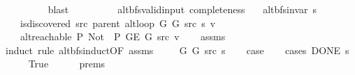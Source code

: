 \begin{isabellebody}
\ \ \ \ \ \ \ \ \isamarkupfalse%
\ blast\isanewline
\ \ \ \ \isamarkupfalse%
\isanewline
\ \ \isamarkupfalse%
\isanewline
{}\isamarkupfalse%
%
\endisatagproof
{\isafoldproof}%
%
\isadelimproof
\isanewline
%
\endisadelimproof
\isanewline
{}\isamarkupfalse%
\ {\isacharparenleft}{\kern0pt}\ alt{\isacharunderscore}{\kern0pt}bfs{\isacharunderscore}{\kern0pt}valid{\isacharunderscore}{\kern0pt}input{\isacharparenright}{\kern0pt}\ completeness{\isacharcolon}{\kern0pt}\isanewline
\ \ \ {\isachardoublequoteopen}alt{\isacharunderscore}{\kern0pt}bfs{\isacharunderscore}{\kern0pt}invar{\isacharprime}{\kern0pt}{\isacharprime}{\kern0pt}\ s{\isachardoublequoteclose}\isanewline
\ \ \ {\isachardoublequoteopen}{\isasymnot}\ is{\isacharunderscore}{\kern0pt}discovered\ src\ {\isacharparenleft}{\kern0pt}parent\ {\isacharparenleft}{\kern0pt}alt{\isacharunderscore}{\kern0pt}loop\ G{}\ G{}\ src\ s{\isacharparenright}{\kern0pt}{\isacharparenright}{\kern0pt}\ v{\isachardoublequoteclose}\isanewline
\ \ \ {\isachardoublequoteopen}{\isasymnot}\ alt{\isacharunderscore}{\kern0pt}reachable\ P{\isacharprime}{\kern0pt}{\isacharprime}{\kern0pt}\ {\isacharparenleft}{\kern0pt}Not\ {\isasymcirc}\ P{\isacharprime}{\kern0pt}{\isacharprime}{\kern0pt}{\isacharparenright}{\kern0pt}\ {\isacharparenleft}{\kern0pt}G{\isachardot}{\kern0pt}E\ G{\isacharparenright}{\kern0pt}\ src\ v{\isachardoublequoteclose}\isanewline
%
\isadelimproof
\ \ %
\endisadelimproof
%
\isatagproof
{}\isamarkupfalse%
\ assms\isanewline
{}\isamarkupfalse%
\ {\isacharparenleft}{\kern0pt}induct\ rule{\isacharcolon}{\kern0pt}\ alt{\isacharunderscore}{\kern0pt}bfs{\isacharunderscore}{\kern0pt}induct{\isacharbrackleft}{\kern0pt}OF\ assms{\isacharparenleft}{\kern0pt}{}{\isacharparenright}{\kern0pt}{\isacharbrackright}{\kern0pt}{\isacharparenright}{\kern0pt}\isanewline
\ \ \isamarkupfalse%
\ {\isacharparenleft}{\kern0pt}{}\ G{}\ G{}\ src\ s{\isacharparenright}{\kern0pt}\isanewline
\ \ \isamarkupfalse%
\ {\isacharquery}{\kern0pt}case\isanewline
\ \ \isamarkupfalse%
\ {\isacharparenleft}{\kern0pt}cases\ {\isachardoublequoteopen}DONE\ s{\isachardoublequoteclose}{\isacharparenright}{\kern0pt}\isanewline
\ \ \ \ \isamarkupfalse%
\ True\isanewline
\ \ \ \ \isamarkupfalse%
\ {\isachardoublequoteopen}{}{\isachardot}{\kern0pt}prems{\isachardoublequoteclose}{\isacharparenleft}{\kern0pt}{}{\isacharparenright}{\kern0pt}\isanewline

\end{isabellebody}
